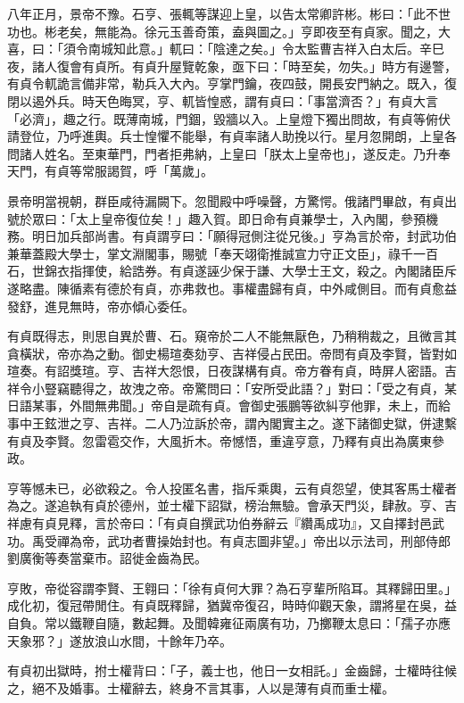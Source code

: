 \begin{pinyinscope}
八年正月，景帝不豫。石亨、張輒等謀迎上皇，以告太常卿許彬。彬曰：「此不世功也。彬老矣，無能為。徐元玉善奇策，盍與圖之。」亨即夜至有貞家。聞之，大喜，曰：「須令南城知此意。」軏曰：「陰達之矣。」令太監曹吉祥入白太后。辛巳夜，諸人復會有貞所。有貞升屋覽乾象，亟下曰：「時至矣，勿失。」時方有邊警，有貞令軏詭言備非常，勒兵入大內。亨掌門鑰，夜四鼓，開長安門納之。既入，復閉以遏外兵。時天色晦冥，亨、軏皆惶惑，謂有貞曰：「事當濟否？」有貞大言「必濟」，趣之行。既薄南城，門錮，毀牆以入。上皇燈下獨出問故，有貞等俯伏請登位，乃呼進輿。兵士惶懼不能舉，有貞率諸人助挽以行。星月忽開朗，上皇各問諸人姓名。至東華門，門者拒弗納，上皇曰「朕太上皇帝也」，遂反走。乃升奉天門，有貞等常服謁賀，呼「萬歲」。

景帝明當視朝，群臣咸待漏闕下。忽聞殿中呼噪聲，方驚愕。俄諸門畢啟，有貞出號於眾曰：「太上皇帝復位矣！」趣入賀。即日命有貞兼學士，入內閣，參預機務。明日加兵部尚書。有貞謂亨曰：「願得冠側注從兄後。」亨為言於帝，封武功伯兼華蓋殿大學士，掌文淵閣事，賜號「奉天翊衛推誠宣力守正文臣」，祿千一百石，世錦衣指揮使，給誥券。有貞遂誣少保于謙、大學士王文，殺之。內閣諸臣斥遂略盡。陳循素有德於有貞，亦弗救也。事權盡歸有貞，中外咸側目。而有貞愈益發舒，進見無時，帝亦傾心委任。

有貞既得志，則思自異於曹、石。窺帝於二人不能無厭色，乃稍稍裁之，且微言其貪橫狀，帝亦為之動。御史楊瑄奏劾亨、吉祥侵占民田。帝問有貞及李賢，皆對如瑄奏。有詔獎瑄。亨、吉祥大怨恨，日夜謀構有貞。帝方眷有貞，時屏人密語。吉祥令小豎竊聽得之，故洩之帝。帝驚問曰：「安所受此語？」對曰：「受之有貞，某日語某事，外間無弗聞。」帝自是疏有貞。會御史張鵬等欲糾亨他罪，未上，而給事中王鉉泄之亨、吉祥。二人乃泣訴於帝，謂內閣實主之。遂下諸御史獄，併逮繫有貞及李賢。忽雷雹交作，大風折木。帝憾悟，重違亨意，乃釋有貞出為廣東參政。

亨等憾未已，必欲殺之。令人投匿名書，指斥乘輿，云有貞怨望，使其客馬士權者為之。遂追執有貞於德州，並士權下詔獄，榜治無驗。會承天門災，肆赦。亨、吉祥慮有貞見釋，言於帝曰：「有貞自撰武功伯券辭云『纘禹成功』，又自擇封邑武功。禹受禪為帝，武功者曹操始封也。有貞志圖非望。」帝出以示法司，刑部侍郎劉廣衡等奏當棄市。詔徙金齒為民。

亨敗，帝從容謂李賢、王翱曰：「徐有貞何大罪？為石亨輩所陷耳。其釋歸田里。」成化初，復冠帶閒住。有貞既釋歸，猶冀帝復召，時時仰觀天象，謂將星在吳，益自負。常以鐵鞭自隨，數起舞。及聞韓雍征兩廣有功，乃擲鞭太息曰：「孺子亦應天象邪？」遂放浪山水間，十餘年乃卒。

有貞初出獄時，拊士權背曰：「子，義士也，他日一女相託。」金齒歸，士權時往候之，絕不及婚事。士權辭去，終身不言其事，人以是薄有貞而重士權。


\end{pinyinscope}
